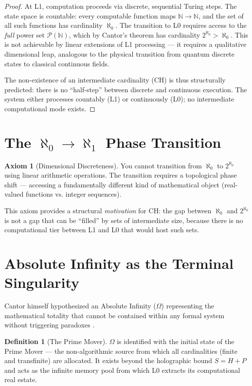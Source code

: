 \documentclass[12pt, a4paper]{article}
\theoremstyle{plain}
\theoremstyle{definition}
\newtheorem{definition}[theorem]{Definition}
\newtheorem{axiom}[theorem]{Axiom}
\theoremstyle{remark}
\begin{document}
\begin{proof}
At L1, computation proceeds via discrete, sequential Turing steps. The state space is countable: every computable function maps $\mathbb{N} \to \mathbb{N}$, and the set of all such functions has cardinality $\aleph_0$. The transition to L0 requires access to the \emph{full} power set $\mathcal{P}(\mathbb{N})$, which by Cantor's theorem has cardinality $2^{\aleph_0} > \aleph_0$. This is not achievable by linear extensions of L1 processing --- it requires a qualitative dimensional leap, analogous to the physical transition from quantum discrete states to classical continuous fields.

The non-existence of an intermediate cardinality (CH) is thus structurally predicted: there is no ``half-step'' between discrete and continuous execution. The system either processes countably (L1) or continuously (L0); no intermediate computational mode exists.
\end{proof}

\section{The $\aleph_0 \to \aleph_1$ Phase Transition}\label{sec:gap}

\begin{axiom}[Dimensional Discreteness]
You cannot transition from $\aleph_0$ to $2^{\aleph_0}$ using linear arithmetic operations. The transition requires a topological phase shift --- accessing a fundamentally different kind of mathematical object (real-valued functions vs. integer sequences).
\end{axiom}

This axiom provides a structural \emph{motivation} for CH: the gap between $\aleph_0$ and $2^{\aleph_0}$ is not a gap that can be ``filled'' by sets of intermediate size, because there is no computational tier between L1 and L0 that would host such sets.

\section{Absolute Infinity as the Terminal Singularity}\label{sec:omega}

Cantor himself hypothesized an Absolute Infinity ($\Omega$) representing the mathematical totality that cannot be contained within any formal system without triggering paradoxes \citep{Cantor1883}.

\begin{definition}[The Prime Mover]
$\Omega$ is identified with the initial state of the Prime Mover --- the non-algorithmic source from which all cardinalities (finite and transfinite) are allocated. It exists beyond the holographic bound $S = H + P$ and acts as the infinite memory pool from which L0 extracts its computational real estate.
\end{definition}
\end{document}
